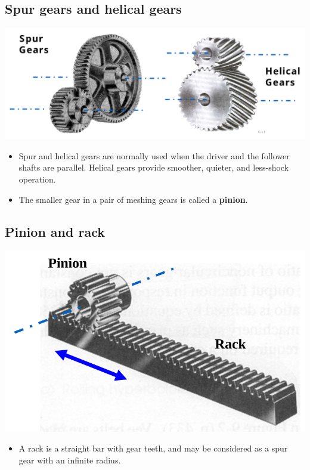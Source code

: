 \documentclass[11pt]{article}
\begin{document}
\subsection{Spur gears and helical gears}
\label{sec:org7a2af47}
\begin{center}
\includegraphics[width=.9\linewidth]{./images/spur-and-helical-gears.png}
\end{center}
\begin{itemize}
\item Spur and helical gears are normally used when the driver and the follower shafts are parallel. Helical gears provide smoother, quieter, and less-shock operation.
\item The smaller gear in a pair of meshing gears is called a \textbf{pinion}.
\end{itemize}
\subsection{Pinion and rack}
\label{sec:org31c4449}
\begin{center}
\includegraphics[width=.9\linewidth]{./images/pinion-and-rack.png}
\end{center}
\begin{itemize}
\item A rack is a straight bar with gear teeth, and may be considered as a spur gear with an infinite radius.
\end{itemize}
\end{document}

